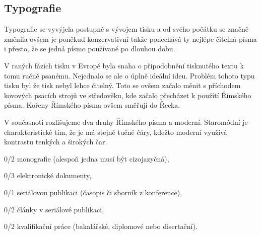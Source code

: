 \documentclass[11pt,a4paper,onecolumn]{article}
\begin{document}
\subsection*{Typografie}
\noindent Typografie se vyvýjela postupně s vývojem tisku a od svého počátku se značně změnila ovšem je poněkud konzervativní takže ponechává ty nejlépe čitelná písma i přesto, že se jedná písmo používané po dlouhou dobu.

\indent V raných fázích tisku v Evropě byla snaha o připodobnění tisknutého textu k tomu ručně psanému. Nejednalo se ale o úplně ideální ideu. Problém tohoto typu tisku byl že tisk nebyl lehce čitelný. Toto se ovšem začalo měnit s příchodem kovových psacích strojů ve středověku, kde začalo přecházet k použítí Římského písma. Kořeny Římského písma ovšem směřují do Řecka.

\noindent V současnoti rozlišujeme dva druhy Římského písma  a moderní. Staromódní je charakteristické tím, že je má stejně tučné čáry, kdežto moderní využívá kontrastu tenkých a širokých čar.
\newpage





   0/2 monografie (alespoň jedna musí být cizojazyčná),
   
   0/3 elektronické dokumenty,
   
   0/1 seriálovou publikaci (časopis či sborník z konference),
   
   0/2 články v seriálové publikaci,
   
   0/2 kvalifikační práce (bakalářské, diplomové nebo disertační).
\end{document}
